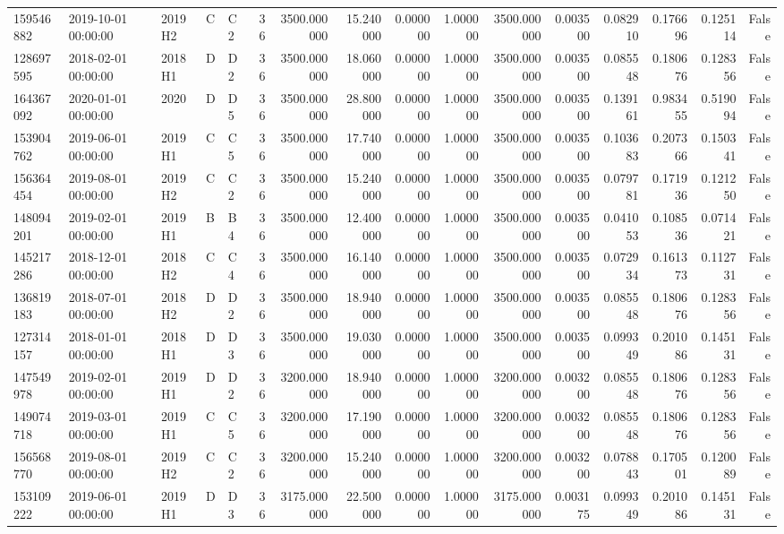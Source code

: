 \begin{tabular}{lllllrrrrrrrrrrr}
159546882 & 2019-10-01 00:00:00 & 2019H2 & C & C2 & 36 & 3500.000000 & 15.240000 & 0.000000 & 1.000000 & 3500.000000 & 0.003500 & 0.082910 & 0.176696 & 0.125114 & False \\
128697595 & 2018-02-01 00:00:00 & 2018H1 & D & D2 & 36 & 3500.000000 & 18.060000 & 0.000000 & 1.000000 & 3500.000000 & 0.003500 & 0.085548 & 0.180676 & 0.128356 & False \\
164367092 & 2020-01-01 00:00:00 & 2020 & D & D5 & 36 & 3500.000000 & 28.800000 & 0.000000 & 1.000000 & 3500.000000 & 0.003500 & 0.139161 & 0.983455 & 0.519094 & False \\
153904762 & 2019-06-01 00:00:00 & 2019H1 & C & C5 & 36 & 3500.000000 & 17.740000 & 0.000000 & 1.000000 & 3500.000000 & 0.003500 & 0.103683 & 0.207366 & 0.150341 & False \\
156364454 & 2019-08-01 00:00:00 & 2019H2 & C & C2 & 36 & 3500.000000 & 15.240000 & 0.000000 & 1.000000 & 3500.000000 & 0.003500 & 0.079781 & 0.171936 & 0.121250 & False \\
148094201 & 2019-02-01 00:00:00 & 2019H1 & B & B4 & 36 & 3500.000000 & 12.400000 & 0.000000 & 1.000000 & 3500.000000 & 0.003500 & 0.041053 & 0.108536 & 0.071421 & False \\
145217286 & 2018-12-01 00:00:00 & 2018H2 & C & C4 & 36 & 3500.000000 & 16.140000 & 0.000000 & 1.000000 & 3500.000000 & 0.003500 & 0.072934 & 0.161373 & 0.112731 & False \\
136819183 & 2018-07-01 00:00:00 & 2018H2 & D & D2 & 36 & 3500.000000 & 18.940000 & 0.000000 & 1.000000 & 3500.000000 & 0.003500 & 0.085548 & 0.180676 & 0.128356 & False \\
127314157 & 2018-01-01 00:00:00 & 2018H1 & D & D3 & 36 & 3500.000000 & 19.030000 & 0.000000 & 1.000000 & 3500.000000 & 0.003500 & 0.099349 & 0.201086 & 0.145131 & False \\
147549978 & 2019-02-01 00:00:00 & 2019H1 & D & D2 & 36 & 3200.000000 & 18.940000 & 0.000000 & 1.000000 & 3200.000000 & 0.003200 & 0.085548 & 0.180676 & 0.128356 & False \\
149074718 & 2019-03-01 00:00:00 & 2019H1 & C & C5 & 36 & 3200.000000 & 17.190000 & 0.000000 & 1.000000 & 3200.000000 & 0.003200 & 0.085548 & 0.180676 & 0.128356 & False \\
156568770 & 2019-08-01 00:00:00 & 2019H2 & C & C2 & 36 & 3200.000000 & 15.240000 & 0.000000 & 1.000000 & 3200.000000 & 0.003200 & 0.078843 & 0.170501 & 0.120089 & False \\
153109222 & 2019-06-01 00:00:00 & 2019H1 & D & D3 & 36 & 3175.000000 & 22.500000 & 0.000000 & 1.000000 & 3175.000000 & 0.003175 & 0.099349 & 0.201086 & 0.145131 & False \\

\end{tabular}

